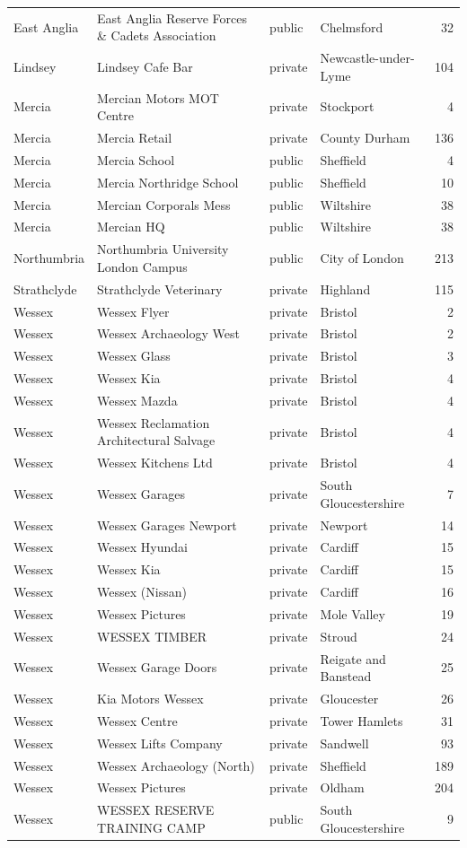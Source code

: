 \documentclass[11pt,a4paper]{article}
\begin{document}
\begin{longtable}{p{2cm}p{6.6cm}lp{3.2cm}r}
East Anglia & East Anglia Reserve Forces \& Cadets Association & public & Chelmsford & 32\\
Lindsey & Lindsey Cafe Bar & private & Newcastle-under-Lyme & 104\\
Mercia & Mercian Motors MOT Centre & private & Stockport & 4\\
Mercia & Mercia Retail & private & County Durham & 136\\
Mercia & Mercia School & public & Sheffield & 4\\
Mercia & Mercia Northridge School & public & Sheffield & 10\\
Mercia & Mercian Corporals Mess & public & Wiltshire & 38\\
Mercia & Mercian HQ & public & Wiltshire & 38\\
Northumbria & Northumbria University London Campus & public & City of London & 213\\
Strathclyde & Strathclyde Veterinary & private & Highland & 115\\
Wessex & Wessex Flyer & private & Bristol & 2\\
Wessex & Wessex Archaeology West & private & Bristol & 2\\
Wessex & Wessex Glass & private & Bristol & 3\\
Wessex & Wessex Kia & private & Bristol & 4\\
Wessex & Wessex Mazda & private & Bristol & 4\\
Wessex & Wessex Reclamation Architectural Salvage & private & Bristol & 4\\
Wessex & Wessex Kitchens Ltd & private & Bristol & 4\\
Wessex & Wessex Garages & private & South Gloucestershire & 7\\
Wessex & Wessex Garages Newport & private & Newport & 14\\
Wessex & Wessex Hyundai & private & Cardiff & 15\\
Wessex & Wessex Kia & private & Cardiff & 15\\
Wessex & Wessex (Nissan) & private & Cardiff & 16\\
Wessex & Wessex Pictures & private & Mole Valley & 19\\
Wessex & WESSEX TIMBER & private & Stroud & 24\\
Wessex & Wessex Garage Doors & private & Reigate and Banstead & 25\\
Wessex & Kia Motors Wessex & private & Gloucester & 26\\
Wessex & Wessex Centre & private & Tower Hamlets & 31\\
Wessex & Wessex Lifts Company & private & Sandwell & 93\\
Wessex & Wessex Archaeology (North) & private & Sheffield & 189\\
Wessex & Wessex Pictures & private & Oldham & 204\\
Wessex & WESSEX RESERVE TRAINING CAMP & public & South Gloucestershire & 9\\
\bottomrule\end{longtable}
\end{document}
